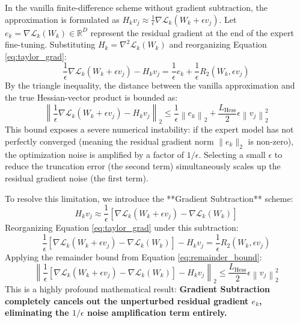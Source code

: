 In the vanilla finite-difference scheme without gradient subtraction, the approximation is formulated as $H_k v_j \approx \frac{1}{\epsilon} \nabla \mathcal{L}_k(W_k + \epsilon v_j)$. Let $e_k = \nabla \mathcal{L}_k(W_k) \in \mathbb{R}^D$ represent the residual gradient at the end of the expert fine-tuning. Substituting $H_k = \nabla^2 \mathcal{L}_k(W_k)$ and reorganizing Equation \ref{eq:taylor_grad}:
\begin{equation}
    \frac{1}{\epsilon} \nabla \mathcal{L}_k(W_k + \epsilon v_j) - H_k v_j = \frac{1}{\epsilon} e_k + \frac{1}{\epsilon} R_2(W_k, \epsilon v_j)
\end{equation}
By the triangle inequality, the distance between the vanilla approximation and the true Hessian-vector product is bounded as:
\begin{equation}
    \left\| \frac{1}{\epsilon} \nabla \mathcal{L}_k(W_k + \epsilon v_j) - H_k v_j \right\|_2 \le \frac{1}{\epsilon} \left\| e_k \right\|_2 + \frac{L_{\text{Hess}}}{2} \epsilon \left\| v_j \right\|_2^2
\label{eq:vanilla_fd_bound}
\end{equation}
This bound exposes a severe numerical instability: if the expert model has not perfectly converged (meaning the residual gradient norm $\|e_k\|_2$ is non-zero), the optimization noise is amplified by a factor of $1 / \epsilon$. Selecting a small $\epsilon$ to reduce the truncation error (the second term) simultaneously scales up the residual gradient noise (the first term).

To resolve this limitation, we introduce the **Gradient Subtraction** scheme:
\begin{equation}
    H_k v_j \approx \frac{1}{\epsilon} \left[ \nabla \mathcal{L}_k(W_k + \epsilon v_j) - \nabla \mathcal{L}_k(W_k) \right]
\end{equation}
Reorganizing Equation \ref{eq:taylor_grad} under this subtraction:
\begin{equation}
    \frac{1}{\epsilon} \left[ \nabla \mathcal{L}_k(W_k + \epsilon v_j) - \nabla \mathcal{L}_k(W_k) \right] - H_k v_j = \frac{1}{\epsilon} R_2(W_k, \epsilon v_j)
\end{equation}
Applying the remainder bound from Equation \ref{eq:remainder_bound}:
\begin{equation}
    \left\| \frac{1}{\epsilon} \left[ \nabla \mathcal{L}_k(W_k + \epsilon v_j) - \nabla \mathcal{L}_k(W_k) \right] - H_k v_j \right\|_2 \le \frac{L_{\text{Hess}}}{2} \epsilon \left\| v_j \right\|_2^2
\label{eq:robust_fd_bound}
\end{equation}
This is a highly profound mathematical result: \textbf{Gradient Subtraction completely cancels out the unperturbed residual gradient $e_k$, eliminating the $1/\epsilon$ noise amplification term entirely.}

